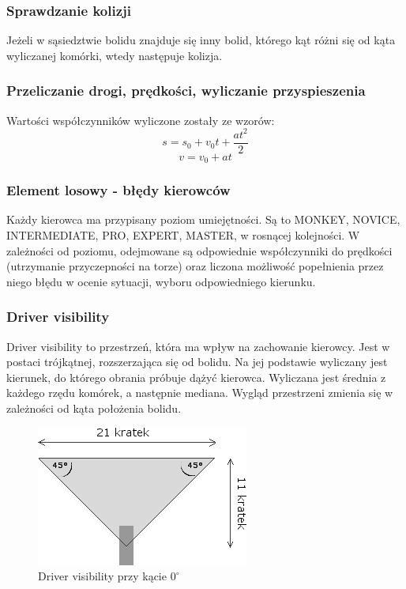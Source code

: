 \documentclass{article}
\begin{document}
\subsubsection{Sprawdzanie kolizji}
Jeżeli w sąsiedztwie bolidu znajduje się inny bolid, którego kąt różni się od kąta wyliczanej komórki, wtedy następuje kolizja.

\subsubsection{Przeliczanie drogi, prędkości, wyliczanie przyspieszenia}
Wartości współczynników wyliczone zostały ze wzorów:
$$
s = s_{0} + v_{0}t + \frac{at^{2}}{2}
$$
$$
v = v_{0} + at
$$

\subsubsection{Element losowy - błędy kierowców}
Każdy kierowca ma przypisany poziom umiejętności. Są to MONKEY, NOVICE, INTERMEDIATE, PRO, EXPERT, MASTER, w rosnącej kolejności. W zależności od poziomu, odejmowane są odpowiednie współczynniki do prędkości (utrzymanie przyczepności na torze) oraz liczona możliwość popełnienia przez niego błędu w ocenie sytuacji, wyboru odpowiedniego kierunku.

\subsubsection{Driver visibility}
Driver visibility to przestrzeń, która ma wpływ na zachowanie kierowcy. Jest w postaci trójkątnej, rozszerzająca się od bolidu. Na jej podstawie wyliczany jest kierunek, do którego obrania próbuje dążyć kierowca. Wyliczana jest średnia z każdego rzędu komórek, a następnie mediana. Wygląd przestrzeni zmienia się w zależności od kąta położenia bolidu.\\

\begin{figure}[h]
\begin{center}
\includegraphics[scale=0.6]{visibility-top.png}
\caption{Driver visibility przy kącie $0^{\circ}$}
\end{center}
\end{figure}
\end{document}
